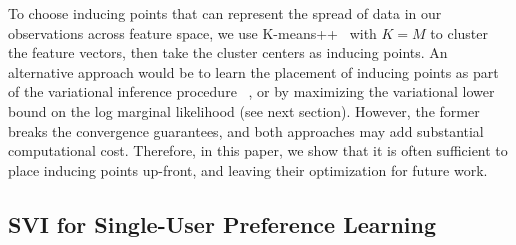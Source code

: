 To choose inducing points that can represent the spread of data in our observations
across feature space, 
we use K-means++~\cite{arthur2007k} with $K=M$ to  
cluster the feature vectors, 
then take the cluster centers as inducing points.
An alternative approach would be to learn the placement of inducing points
as part of the variational inference procedure ~\citep{???},
or by maximizing the variational lower bound on the log marginal likelihood 
(see next section).
However, the former breaks the convergence guarantees, and both approaches
may add substantial computational cost. 
Therefore, in this paper, we show that it is often sufficient to place inducing points up-front, and leaving their optimization for future work. 

\subsection{SVI for Single-User Preference Learning}


